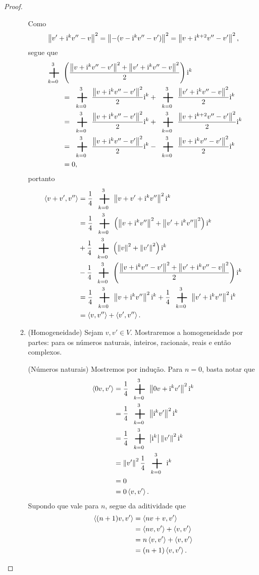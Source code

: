 \begin{proof}
\begin{enumerate}
\begin{enumerate}
	Como
		\begin{equation*}
		\left\Vert{v'+\mathrm{i}^kv''-v}\right\Vert^2 = \left\Vert{-(v-\mathrm{i}^kv''-v')}\right\Vert^2 = \left\Vert{v+\mathrm{i}^{k+2}v''-v'}\right\Vert^2,
		\end{equation*}
	segue que
		\begin{align*}
		\sum_{k=0}^{3} &\left(\frac{\nor{v+\ii^kv''-v'}^2 + \nor{v'+\ii^kv''-v}^2}{2}\right)\ii^k \\
		&= \sum_{k=0}^{3} \frac{\nor{v+\ii^kv''-v'}^2}{2}\ii^k + \sum_{k=0}^{3} \frac{\nor{v'+\ii^kv''-v}^2}{2}\ii^k \\
		&= \sum_{k=0}^{3} \frac{\nor{v+\ii^kv''-v'}^2}{2}\ii^k + \sum_{k=0}^{3} \frac{\nor{v+\ii^{k+2}v''-v'}^2}{2}\ii^k \\
		&= \sum_{k=0}^{3} \frac{\nor{v+\ii^kv''-v'}^2}{2}\ii^k - \sum_{k=0}^{3} \frac{\nor{v+\ii^kv''-v'}^2}{2}\ii^k \\
		&=0,
		\end{align*}
	portanto
		\begin{align*}
		\inte{v+v'}{v''} &= \frac{1}{4} \sum_{k=0}^{3} \nor{v+v'+\ii^kv''}^2 \ii^k \\
			&= \frac{1}{4} \sum_{k=0}^{3} \left(\nor{v+\ii^kv''}^2 + \nor{v'+\ii^kv''}^2\right)\ii^k \\
			&+ \frac{1}{4} \sum_{k=0}^{3} \left(\nor{v}^2 + \nor{v'}^2\right)\ii^k \\
			&- \frac{1}{4} \sum_{k=0}^{3} \left(\frac{\nor{v+\ii^kv''-v'}^2 + \nor{v'+\ii^kv''-v}^2}{2}\right)\ii^k \\
			&= \frac{1}{4} \sum_{k=0}^{3} \nor{v+\ii^kv''}^2\ii^k + \frac{1}{4} \sum_{k=0}^{3} \nor{v'+\ii^kv''}^2\ii^k \\
			&= \inte{v}{v''} + \inte{v'}{v''}.
		\end{align*}

	\item (Homogeneidade) Sejam $v,v' \in V$. Mostraremos a homogeneidade por partes: para os números naturais, inteiros, racionais, reais e então complexos.

	(Números naturais) Mostremos por indução. Para $n=0$, basta notar que
		\begin{align*}
		\inte{0v}{v'} &= \frac{1}{4} \sum_{k=0}^{3} \nor{0v+\ii^kv'}^2 \ii^k \\
			&= \frac{1}{4} \sum_{k=0}^{3} \nor{\ii^kv'}^2 \ii^k \\
			&= \frac{1}{4} \sum_{k=0}^{3} \abs{\ii^k}\nor{v'}^2 \ii^k \\
			&= \nor{v'}^2\frac{1}{4} \sum_{k=0}^{3} \ii^k \\
			&= 0 \\
			&= 0 \inte{v}{v'}.
		\end{align*}
	Supondo que vale para $n$, segue da aditividade que
		\begin{align*}
		\left\langle{(n+1)v},{v'}\right\rangle &= \left\langle{nv+v},{v'}\right\rangle \\
			&= \left\langle{nv},{v'}\right\rangle + \left\langle{v},{v'}\right\rangle \\
			&= n\left\langle{v},{v'}\right\rangle + \left\langle{v},{v'}\right\rangle \\
			&= (n+1)\left\langle{v},{v'}\right\rangle.
		\end{align*}


\end{enumerate}
\end{enumerate}
\end{proof}
